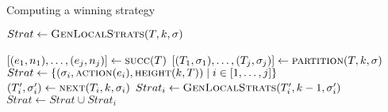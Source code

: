 


\begin{algorithm}
   \caption{Computing a winning strategy}\label{alg:strat}
   \begin{algorithmic}[1]
            \State $Strat \gets \Call{GenLocalStrats}{T, k, \sigma}$
            \State {}
        \EndFunction
        \Statex

            \State $[(e_1, n_1),\ldots,(e_j, n_j)] \gets \Call{succ}{T}$
            \State $[(T_1,\sigma_1),\ldots,(T_j, \sigma_j)] \gets \Call{partition}{T, k, \sigma}$
            \State $Strat \gets \{(\sigma_i, \Call{action}{e_i}, \Call{height}{k, T}) \mid i \in[1,\ldots,j]\}$\label{alg:strat:strati}
            \label{alg:strat:for}
            \State $(T_i', \sigma_i') \gets \Call{next}{T_i, k, \sigma_i}$\label{alg:strat:next}
                \State $Strat_i \gets \Call{GenLocalStrats}{T_i', k-1, \sigma_i'}$\label{alg:strat:rec}
                \State $Strat \gets Strat \cup Strat_i$
            \EndFor\label{alg:strat:endfor}
            \State {} \label{alg:strat:return}
        \EndFunction
    \end{algorithmic}
\end{algorithm}


